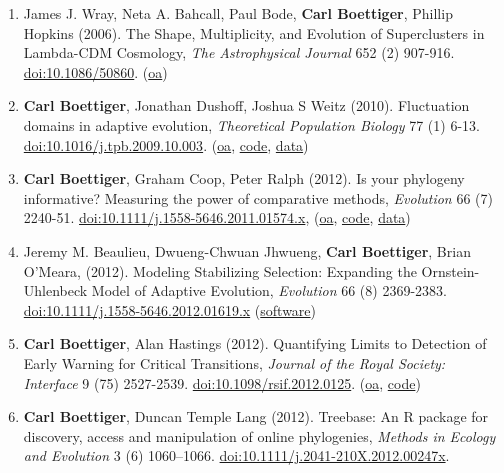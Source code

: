 \documentclass[10pt,sans]{moderncv}        %
\begin{document}
\begin{enumerate}
\def\labelenumi{\arabic{enumi}.}
\item
  James J. Wray, Neta A. Bahcall, Paul Bode, \textbf{Carl Boettiger},
  Phillip Hopkins (2006). The Shape, Multiplicity, and Evolution of
  Superclusters in Lambda-CDM Cosmology, \emph{The Astrophysical
  Journal} 652 (2) 907-916.
  \href{http://dx.doi.org/10.1086/508600}{doi:10.1086/50860}.
  (\href{http://arxiv.org/abs/astro-ph/0603060}{oa})
\item
  \textbf{Carl Boettiger}, Jonathan Dushoff, Joshua S Weitz (2010).
  Fluctuation domains in adaptive evolution, \emph{Theoretical
  Population Biology} 77 (1) 6-13.
  \href{http://dx.doi.org/10.1016/j.tpb.2009.10.003}{doi:10.1016/j.tpb.2009.10.003}.
  (\href{http://arxiv.org/abs/1004.4233}{oa},
  \href{https://github.com/cboettig/fluctuationDomains}{code},
  \href{http://datadryad.org/handle/10255/dryad.37625}{data})
\item
  \textbf{Carl Boettiger}, Graham Coop, Peter Ralph (2012). Is your
  phylogeny informative? Measuring the power of comparative methods,
  \emph{Evolution} 66 (7) 2240-51.
  \href{http://dx.doi.org/10.1111/j.1558-5646.2011.01574.x}{doi:10.1111/j.1558-5646.2011.01574.x},
  (\href{http://arxiv.org/abs/1110.4944}{oa},
  \href{https://github.com/cboettig/pmc}{code},
  \href{http://datadryad.org/handle/10255/dryad.37645}{data})
\item
  Jeremy M. Beaulieu, Dwueng-Chwuan Jhwueng, \textbf{Carl Boettiger},
  Brian O'Meara, (2012). Modeling Stabilizing Selection: Expanding the
  Ornstein-Uhlenbeck Model of Adaptive Evolution, \emph{Evolution} 66
  (8) 2369-2383.
  \href{http://dx.doi.org/10.1111/j.1558-5646.2012.01619.x}{doi:10.1111/j.1558-5646.2012.01619.x}
  (\href{http://cran.r-project.org/web/packages/OUwie/index.html}{software})
\item
  \textbf{Carl Boettiger}, Alan Hastings (2012). Quantifying Limits to
  Detection of Early Warning for Critical Transitions, \emph{Journal of
  the Royal Society: Interface} 9 (75) 2527-2539.
  \href{http://dx.doi.org/10.1098/rsif.2012.0125}{doi:10.1098/rsif.2012.0125}.
  (\href{http://arxiv.org/abs/1204.6231}{oa},
  \href{https://github.com/cboettig/earlywarning}{code})
\item
  \textbf{Carl Boettiger}, Duncan Temple Lang (2012). Treebase: An R
  package for discovery, access and manipulation of online phylogenies,
  \emph{Methods in Ecology and Evolution} 3 (6) 1060--1066.
  \href{http://dx.doi.org/10.1111/j.2041-210X.2012.00247.x}{doi:10.1111/j.2041-210X.2012.00247x}.

\end{enumerate}
\end{document}
